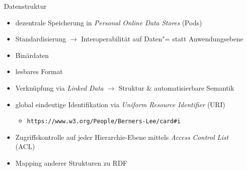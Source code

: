 \begin{frame}{Datenstruktur}
    \begin{itemize}
        \item dezentrale Speicherung in \emph{Personal Online Data Stores} (Pods)~\cite{mecklerWebLinkedData2023,sambraSolidPlatformDecentralized2016}
        \item Standardisierung $\to$ Interoperabilität auf Daten"= statt Anwendungsebene
        
        \item Binärdaten 
        
        \pause
        \pause
        \item lesbares Format 
        
        \pause
        \pause
        \item Verknüpfung via \emph{Linked Data} $\to$ Struktur \& automatisierbare Semantik~\cite{bizerLinkedDataStory2009,mecklerWebLinkedData2023}

        \pause
        \item global eindeutige Identifikation via \emph{Uniform Resource Identifier} (URI)~\cite{sambraSolidPlatformDecentralized2016}
        \begin{itemize}
            \item \texttt{https://www.w3.org/People/Berners-Lee/card\#i}~\cite{bizerLinkedDataStory2009}
        \end{itemize}
        
        \pause
        \item Zugriffskontrolle auf jeder Hierarchie-Ebene mittels \emph{Access Control List} (ACL)
        
        \pause
        \item Mapping anderer Strukturen zu RDF~\cite{mecklerWebLinkedData2023,sambraSolidPlatformDecentralized2016}
    \end{itemize}
\end{frame}

